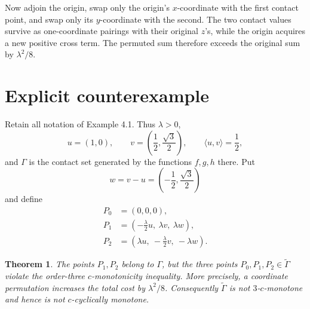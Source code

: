 \documentclass[11pt]{article}
\newtheorem{theorem}{Theorem}
\begin{document}
Now adjoin the origin, swap only the origin's \(x\)-coordinate with the
first contact point, and swap only its \(y\)-coordinate with the second.
The two contact values survive as one-coordinate pairings with their
original \(z\)'s, while the origin acquires a new positive cross term.  The
permuted sum therefore exceeds the original sum by \(\lambda^2/8\).

\section{Explicit counterexample}

Retain all notation of Example 4.1.  Thus \(\lambda>0\),
\[
 u=(1,0),\qquad v=\left(\frac12,\frac{\sqrt3}{2}\right),
 \qquad \langle u,v\rangle=\frac12,
\]
and \(\Gamma\) is the contact set generated by the functions \(f,g,h\)
there.  Put
\[
 w=v-u=\left(-\frac12,\frac{\sqrt3}{2}\right)
\]
and define
\begin{align*}
 P_0&=(0,0,0),\\
 P_1&=\left(-\frac{\lambda}{2}u,\ \lambda v,\ \lambda w\right),\\
 P_2&=\left(\lambda u,\ -\frac{\lambda}{2}v,\ -\lambda w\right).
\end{align*}

\begin{theorem}
The points \(P_1,P_2\) belong to \(\Gamma\), but the three points
\(P_0,P_1,P_2\in\widetilde\Gamma\) violate the order-three
\(c\)-monotonicity inequality.  More precisely, a coordinate permutation
increases the total cost by \(\lambda^2/8\).  Consequently
\(\widetilde\Gamma\) is not \(3\)-\(c\)-monotone and hence is not
\(c\)-cyclically monotone.
\end{theorem}
\end{document}
